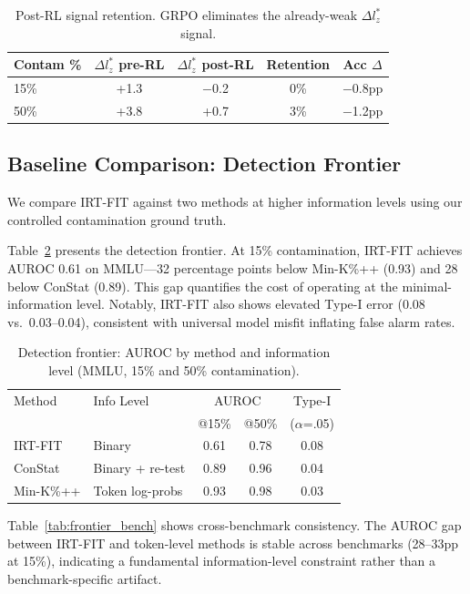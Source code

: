 \documentclass[11pt,a4paper]{article}
\begin{document}
\begin{table}[t]
\centering
\small
\begin{tabular}{lcccc}
\toprule
Contam \% & $\Delta l_{z}^{*}$ pre-RL & $\Delta l_{z}^{*}$ post-RL & Retention & Acc $\Delta$ \\
\midrule
15\% & +1.3 & $-$0.2 & 0\% & $-$0.8pp \\
50\% & +3.8 & +0.7 & 3\% & $-$1.2pp \\
\bottomrule
\end{tabular}
\caption{Post-RL signal retention. GRPO eliminates the already-weak $\Delta l_{z}^{*}$ signal.}
\label{tab:postrl}
\end{table}

\subsection{Baseline Comparison: Detection Frontier}
\label{sec:baseline}

We compare IRT-FIT against two methods at higher information levels using our controlled contamination ground truth.

Table~\ref{tab:frontier} presents the detection frontier.
At 15\% contamination, IRT-FIT achieves AUROC 0.61 on MMLU---32 percentage points below Min-K\%++ (0.93) and 28 below ConStat (0.89).
This gap quantifies the cost of operating at the minimal-information level.
Notably, IRT-FIT also shows elevated Type-I error (0.08 vs.\ 0.03--0.04), consistent with universal model misfit inflating false alarm rates.

\begin{table}[t]
\centering
\small
\begin{tabular}{llccc}
\toprule
Method & Info Level & \multicolumn{2}{c}{AUROC} & Type-I \\
 & & @15\% & @50\% & ($\alpha$=.05) \\
\midrule
IRT-FIT & Binary & 0.61 & 0.78 & 0.08 \\
ConStat & Binary + re-test & 0.89 & 0.96 & 0.04 \\
Min-K\%++ & Token log-probs & 0.93 & 0.98 & 0.03 \\
\bottomrule
\end{tabular}
\caption{Detection frontier: AUROC by method and information level (MMLU, 15\% and 50\% contamination).}
\label{tab:frontier}
\end{table}

Table~\ref{tab:frontier_bench} shows cross-benchmark consistency.
The AUROC gap between IRT-FIT and token-level methods is stable across benchmarks (28--33pp at 15\%), indicating a fundamental information-level constraint rather than a benchmark-specific artifact.
\end{document}
